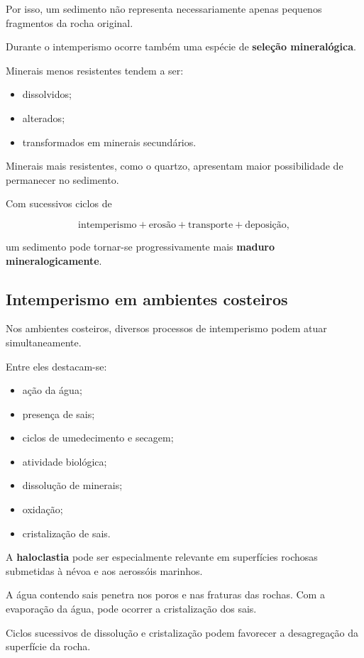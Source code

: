 \documentclass[a4paper,12pt]{article}
\theoremstyle{definition}
\theoremstyle{definition}
\theoremstyle{definition}
\begin{document}
Por isso, um sedimento não representa necessariamente apenas pequenos fragmentos da rocha original.

Durante o intemperismo ocorre também uma espécie de \textbf{seleção mineralógica}.

Minerais menos resistentes tendem a ser:

\begin{itemize}
    \item dissolvidos;
    \item alterados;
    \item transformados em minerais secundários.
\end{itemize}

Minerais mais resistentes, como o quartzo, apresentam maior possibilidade de permanecer no sedimento.

Com sucessivos ciclos de

\[
\text{intemperismo}
+
\text{erosão}
+
\text{transporte}
+
\text{deposição},
\]

um sedimento pode tornar-se progressivamente mais \textbf{maduro mineralogicamente}.

\subsection{Intemperismo em ambientes costeiros}

Nos ambientes costeiros, diversos processos de intemperismo podem atuar simultaneamente.

Entre eles destacam-se:

\begin{itemize}
    \item ação da água;
    \item presença de sais;
    \item ciclos de umedecimento e secagem;
    \item atividade biológica;
    \item dissolução de minerais;
    \item oxidação;
    \item cristalização de sais.
\end{itemize}

A \textbf{haloclastia} pode ser especialmente relevante em superfícies rochosas submetidas à névoa e aos aerossóis marinhos.

A água contendo sais penetra nos poros e nas fraturas das rochas. Com a evaporação da água, pode ocorrer a cristalização dos sais.

Ciclos sucessivos de dissolução e cristalização podem favorecer a desagregação da superfície da rocha.
\end{document}
